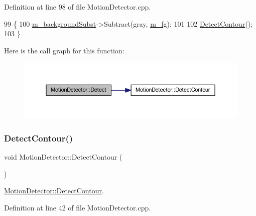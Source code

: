Definition at line 98 of file Motion\+Detector.\+cpp.


\begin{DoxyCode}
99 \{
100     \mbox{\hyperlink{class_motion_detector_ab0f8334cbe63bfaae0ed54650336e0d4}{m\_backgroundSubst}}->Subtract(gray, \mbox{\hyperlink{class_motion_detector_ac751815be986935ac095aff5428b6c24}{m\_fg}});
101 
102     \mbox{\hyperlink{class_motion_detector_ab45a525c0ef2f5af9bc10c363c1b22e5}{DetectContour}}();
103 \}
\end{DoxyCode}
Here is the call graph for this function\+:\nopagebreak
\begin{figure}[H]
\begin{center}
\leavevmode
\includegraphics[width=350pt]{class_motion_detector_aac68875ab09d4436391855e2df4e0e06_cgraph}
\end{center}
\end{figure}
\mbox{\label{class_motion_detector_ab45a525c0ef2f5af9bc10c363c1b22e5}} 
\subsubsection{\texorpdfstring{Detect\+Contour()}{DetectContour()}}
{\footnotesize\ttfamily void Motion\+Detector\+::\+Detect\+Contour (\begin{DoxyParamCaption}{ }\end{DoxyParamCaption})\hspace{0.3cm}{\ttfamily [private]}}



\mbox{\hyperlink{class_motion_detector_ab45a525c0ef2f5af9bc10c363c1b22e5}{Motion\+Detector\+::\+Detect\+Contour}}. 



Definition at line 42 of file Motion\+Detector.\+cpp.


